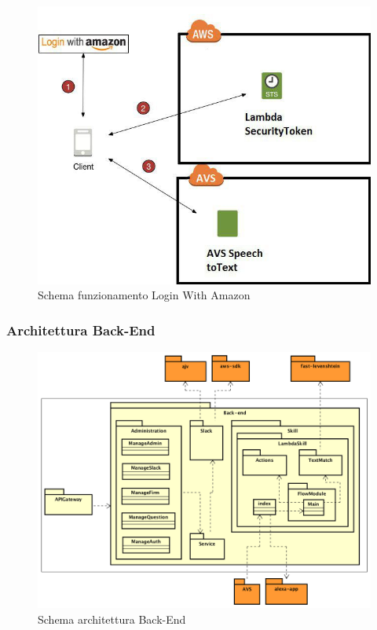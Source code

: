 \documentclass[../DefinizioneDiProdotto_v3.0.0.tex]{subfiles}
\begin{document}
\begin{figure}[!h]
	\centering
	\includegraphics[scale=0.5]{Architettura/schemaAutenticazione.jpg}
	\caption{Schema funzionamento Login With Amazon}
\end{figure}

\clearpage
\subsubsection{Architettura Back-End}
\begin{figure}[!h]
	\centering
	\includegraphics[scale=0.5]{Architettura/Back-end.png}
	\caption{Schema architettura Back-End}
\end{figure}
\end{document}
